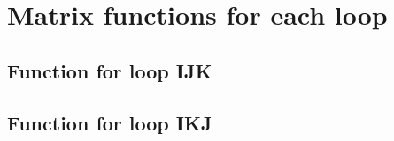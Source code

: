 \documentclass{sigplanconf}
\begin{document}
\section{Matrix functions for each loop}
\subsection{Function for loop IJK}
\label{appendix:mm_ijk.c}


\subsection{Function for loop IKJ}
\label{appendix:mm_ikj.c}





\end{document}
